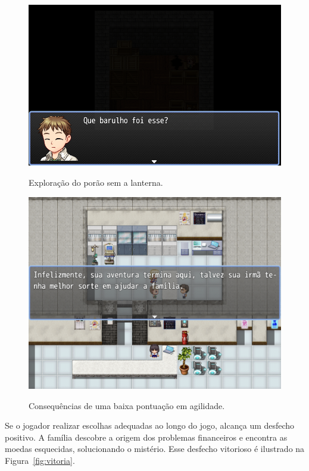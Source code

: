 \begin{figure}[!htbp]
	\centering
	\caption{Exploração do porão sem a lanterna.}
	\includegraphics[scale=0.55]{Textuais/Pictures/explorando-porao-sem-lanterna.png}
	\label{fig:explorando-porao-sem-lanterna}
\end{figure}

\begin{figure}[!htbp]
	\centering
	\caption{Consequências de uma baixa pontuação em agilidade.}
	\includegraphics[scale=0.4]{Textuais/Pictures/game-over.png}
	\label{fig:game-over}
\end{figure}

Se o jogador realizar escolhas adequadas ao longo do jogo, alcança um desfecho positivo. A família descobre a origem dos problemas financeiros e encontra as moedas esquecidas, solucionando o mistério. Esse desfecho vitorioso é ilustrado na Figura~\ref{fig:vitoria}.

